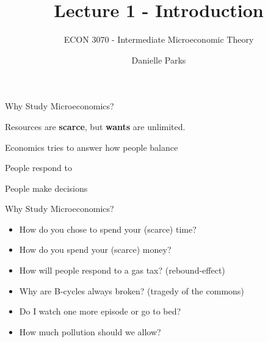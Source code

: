 \documentclass{beamer}
\author{Danielle Parks}
\title{Lecture 1 - Introduction}
\subtitle{ECON 3070 - Intermediate Microeconomic Theory}
\begin{document}
\begin{frame}
  \titlepage
\end{frame}

\begin{frame}{Why Study Microeconomics?}
  \begin{center}
    Resources are \textbf{scarce}, but \textbf{wants} are unlimited.
  \end{center}

  \bigskip
  \begin{center}
    Economics tries to answer how people balance 
  \end{center}

  \bigskip
  \begin{center}
    People respond to 
  \end{center}

  \bigskip
  \begin{center}
    People make decisions 
  \end{center}
\end{frame}

\begin{frame}{Why Study Microeconomics?}
  \begin{itemize}
    \item How do you chose to spend your (scarce) time? 
    \item How do you spend your (scarce) money?
  \end{itemize}
  
  \bigskip
  \begin{itemize}
    \item How will people respond to a gas tax? (rebound-effect) 
    \item Why are B-cycles always broken? (tragedy of the commons)
  \end{itemize}
  
 \bigskip
  \begin{itemize}
    \item Do I watch one more episode or go to bed? 
    \item How much pollution should we allow?
  \end{itemize}
\end{frame}
\end{document}
